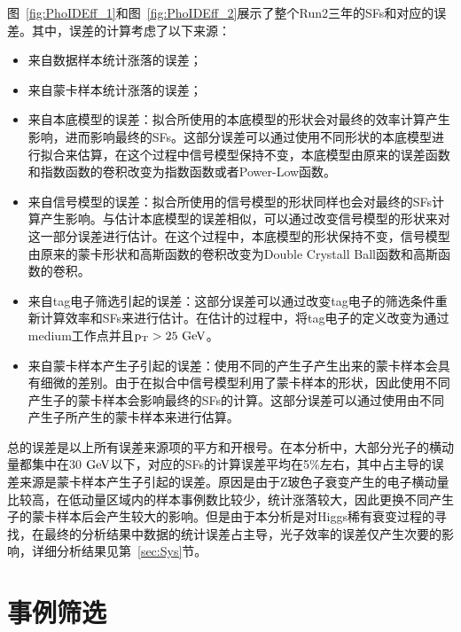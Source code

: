 图~\ref{fig:PhoIDEff_1}和图~\ref{fig:PhoIDEff_2}展示了整个Run2三年的SFs和对应的误差。其中，误差的计算考虑了以下来源：
\begin{itemize}
    \item 来自数据样本统计涨落的误差；
    \item 来自蒙卡样本统计涨落的误差；
    \item 来自本底模型的误差：拟合所使用的本底模型的形状会对最终的效率计算产生影响，进而影响最终的SFs。这部分误差可以通过使用不同形状的本底模型进行拟合来估算，在这个过程中信号模型保持不变，本底模型由原来的误差函数和指数函数的卷积改变为指数函数或者Power-Low函数。
    \item 来自信号模型的误差：拟合所使用的信号模型的形状同样也会对最终的SFs计算产生影响。与估计本底模型的误差相似，可以通过改变信号模型的形状来对这一部分误差进行估计。在这个过程中，本底模型的形状保持不变，信号模型由原来的蒙卡形状和高斯函数的卷积改变为Double Crystall Ball函数和高斯函数的卷积。
    \item 来自tag电子筛选引起的误差：这部分误差可以通过改变tag电子的筛选条件重新计算效率和SFs来进行估计。在估计的过程中，将tag电子的定义改变为通过medium工作点并且$\pt>25\GeV$。
    \item 来自蒙卡样本产生子引起的误差：使用不同的产生子产生出来的蒙卡样本会具有细微的差别。由于在拟合中信号模型利用了蒙卡样本的形状，因此使用不同产生子的蒙卡样本会影响最终的SFs的计算。这部分误差可以通过使用由不同产生子所产生的蒙卡样本来进行估算。
\end{itemize}

总的误差是以上所有误差来源项的平方和开根号。在本分析中，大部分光子的横动量都集中在30$\GeV$以下，对应的SFs的计算误差平均在5\%左右，其中占主导的误差来源是蒙卡样本产生子引起的误差。原因是由于Z玻色子衰变产生的电子横动量比较高，在低动量区域内的样本事例数比较少，统计涨落较大，因此更换不同产生子的蒙卡样本后会产生较大的影响。但是由于本分析是对Higgs稀有衰变过程的寻找，在最终的分析结果中数据的统计误差占主导，光子效率的误差仅产生次要的影响，详细分析结果见第~\ref{sec:Sys}节。

\section{事例筛选}\label{sec:EventSelect}

